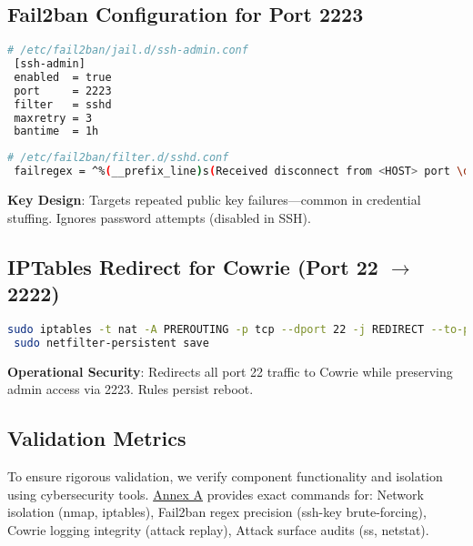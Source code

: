 \documentclass{cls/ULBreport}
\begin{document}
        \subsection{Fail2ban Configuration for Port 2223}
        \begin{lstlisting}[language=bash,caption={Custom Jail Rules}]
 # /etc/fail2ban/jail.d/ssh-admin.conf
 [ssh-admin]
 enabled  = true
 port     = 2223
 filter   = sshd
 maxretry = 3  
 bantime  = 1h
        \end{lstlisting}
        
        \begin{lstlisting}[language=bash,caption={Regex Filter Against Key-Based Attacks}]
 # /etc/fail2ban/filter.d/sshd.conf
 failregex = ^%(__prefix_line)s(Received disconnect from <HOST> port \d+: Too many authentication failures)
        \end{lstlisting}
        
        \textbf{Key Design}: Targets repeated public key failures—common in credential stuffing. Ignores password attempts (disabled in SSH).
        
        \subsection{IPTables Redirect for Cowrie (Port 22 $\rightarrow$ 2222)}
        \begin{lstlisting}[language=bash,caption={Traffic Redirection Pre-Cowrie}]
 sudo iptables -t nat -A PREROUTING -p tcp --dport 22 -j REDIRECT --to-port 2222
 sudo netfilter-persistent save
        \end{lstlisting}
        
        \textbf{Operational Security}: Redirects all port 22 traffic to Cowrie while preserving admin access via 2223. Rules persist reboot.


        \subsection{Validation Metrics}  
        \label{sec:validation}  
        
        To ensure rigorous validation, we verify component functionality and isolation using cybersecurity tools.  
            \hyperref[annexa:network]{Annex A} provides exact commands for:  Network isolation (nmap, iptables), Fail2ban regex precision (ssh-key brute-forcing), Cowrie logging integrity (attack replay), Attack surface audits (ss, netstat).
        









    
    



    
\end{document}
